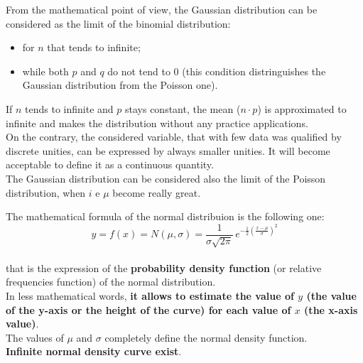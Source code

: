 \begin{frame}
  \vspace*{.25cm}
  From the mathematical point of view, the Gaussian distribution can be considered as the limit of the binomial distribution:\\
  \begin{itemize}
    \item for $ n $ that tends to infinite;
    \item while both $ p $ and $ q $ do not tend to 0 (this condition distringuishes the Gaussian distribution from the Poisson one).
  \end{itemize}
  \vspace*{.25cm}
  If $ n $ tends to infinite and $ p $ stays constant, the mean ($ n \cdot p $) is approximated to infinite and makes the distribution without any practice applications.\\
  \vspace*{.25cm}
  On the contrary, the considered variable, that with few data was qualified by discrete unities, can be expressed by always smaller unities. It will become acceptable to define it as a continuous quantity.\\
  The Gaussian distribution can be considered also the limit of the Poisson distribution, when $ i $ e $ \mu $ become really great.
\end{frame}

\begin{frame}
  \vspace*{.25cm}
  The mathematical formula of the normal distribuion is the following one:
  \vspace*{.25cm}
  $$ y = f(x) = N(\mu,\sigma) = \frac{1}{\sigma \sqrt{2\pi}}\, e^{-\frac{1}{2} \left( \frac{x-\mu}{\sigma} \right) ^2} $$ \\
  \vspace*{.25cm}
  that is the expression of the \textbf{probability density function} (or relative frequencies function) of the normal distribution.\\
  \vspace*{.25cm}
  In less mathematical words, \textbf{it allows to estimate the value of $ y $ (the value of the y-axis or the height of the curve) for each value of $ x $ (the x-axis value)}.\\
  \vspace*{.25cm}
  The values of $ \mu $ and $ \sigma $ completely define the normal density function.\\
  \vspace*{.25cm}
  \textbf{Infinite normal density curve exist}.
\end{frame}

